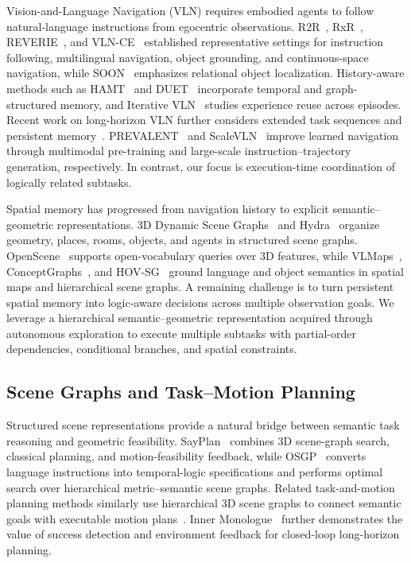 \documentclass[letterpaper,10pt,conference]{ieeeconf}
\begin{document}
Vision-and-Language Navigation (VLN) requires embodied agents to follow natural-language instructions from egocentric observations. R2R~\cite{anderson2018r2r}, RxR~\cite{ku2020rxr}, REVERIE~\cite{qi2020reverie}, and VLN-CE~\cite{krantz2020vlnce} established representative settings for instruction following, multilingual navigation, object grounding, and continuous-space navigation, while SOON~\cite{zhu2021soon} emphasizes relational object localization. History-aware methods such as HAMT~\cite{chen2021hamt} and DUET~\cite{chen2022duet} incorporate temporal and graph-structured memory, and Iterative VLN~\cite{krantz2023ivln} studies experience reuse across episodes. Recent work on long-horizon VLN further considers extended task sequences and persistent memory~\cite{song2024lhvln}. PREVALENT~\cite{hao2020prevalent} and ScaleVLN~\cite{wang2023scalevln} improve learned navigation through multimodal pre-training and large-scale instruction--trajectory generation, respectively. In contrast, our focus is execution-time coordination of logically related subtasks.

Spatial memory has progressed from navigation history to explicit semantic--geometric representations. 3D Dynamic Scene Graphs~\cite{rosinol2020dsg} and Hydra~\cite{hughes2022hydra} organize geometry, places, rooms, objects, and agents in structured scene graphs. OpenScene~\cite{peng2023openscene} supports open-vocabulary queries over 3D features, while VLMaps~\cite{huang2023vlmaps}, ConceptGraphs~\cite{gu2024conceptgraphs}, and HOV-SG~\cite{werby2024hovsg} ground language and object semantics in spatial maps and hierarchical scene graphs. A remaining challenge is to turn persistent spatial memory into logic-aware decisions across multiple observation goals. We leverage a hierarchical semantic--geometric representation acquired through autonomous exploration to execute multiple subtasks with partial-order dependencies, conditional branches, and spatial constraints.

\subsection{Scene Graphs and Task--Motion Planning}

Structured scene representations provide a natural bridge between semantic task reasoning and geometric feasibility. SayPlan~\cite{rana2023sayplan} combines 3D scene-graph search, classical planning, and motion-feasibility feedback, while OSGP~\cite{dai2024osgp} converts language instructions into temporal-logic specifications and performs optimal search over hierarchical metric--semantic scene graphs. Related task-and-motion planning methods similarly use hierarchical 3D scene graphs to connect semantic goals with executable motion plans~\cite{ray2024tamp}. Inner Monologue~\cite{huang2023innermonologue} further demonstrates the value of success detection and environment feedback for closed-loop long-horizon planning.
\end{document}
